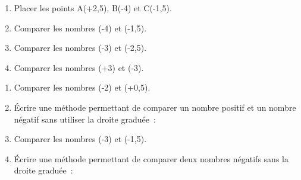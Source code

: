 \documentclass[activite]{thedocument}
\begin{document}
{\centering {}}\vskip15pt\par
\begin{enumerate}
    \item Placer les points A(+2,5), B(-4) et C(-1,5).\answerspace{1em}
    \item Comparer les nombres (-4) et (-1,5).\answerspace{1em}
    \item Comparer les nombres (-3) et (-2,5).\answerspace{1em}
    \item Comparer les nombres (+3) et (-3).\answerspace{1em}
\end{enumerate}
\vskip10pt\par
\begin{enumerate}
    \item Comparer les nombres (-2) et (+0,5).
    \item Écrire une méthode permettant de comparer un nombre positif et un
    nombre négatif sans utiliser la droite graduée~:
    \answerspace{2em}
    \item Comparer les nombres (-3) et (-1,5).
    \item Écrire une méthode permettant de comparer deux nombres négatifs
    sans la droite graduée~:
    \answerspace{2em}
\end{enumerate}
\end{document}
